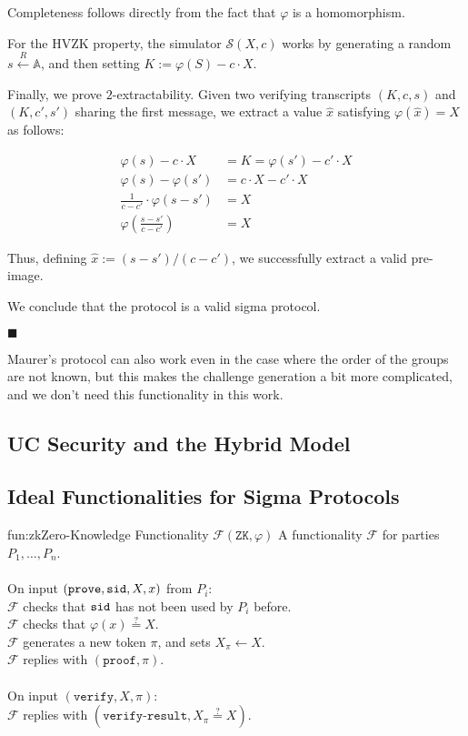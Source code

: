 Completeness follows directly from the fact that $\varphi$ is a homomorphism.

For the HVZK property, the simulator $\mathcal{S}(X, c)$ works by generating
a random $s \xleftarrow{R} \mathbb{A}$, and then setting $K := \varphi(S) - c \cdot X$.

Finally, we prove $2$-extractability. Given two verifying transcripts
$(K, c, s)$ and $(K, c', s')$ sharing the first message, we extract
a value $\hat{x}$ satisfying $\varphi(\hat{x}) = X$ as follows:

$$
\begin{aligned}
\varphi(s) - c \cdot X &= K = \varphi(s') - c' \cdot X\\
\varphi(s) - \varphi(s') &= c \cdot X - c' \cdot X\\
\frac{1}{c - c'} \cdot \varphi(s - s') &= X\\
\varphi \left(\frac{s - s'}{c - c'}\right) &= X
\end{aligned}
$$

Thus, defining $\hat{x} := (s - s') / (c - c')$, we successfully extract
a valid pre-image.

We conclude that the protocol is a valid sigma protocol.

$\blacksquare$

Maurer's protocol can also work even in the case where the order of
the groups are not known, but this makes the challenge generation
a bit more complicated, and we don't need this functionality in
this work.

\subsection{UC Security and the Hybrid Model}

\subsection{Ideal Functionalities for Sigma Protocols}

\begin{afunctionality}{fun:zk}{Zero-Knowledge Functionality $\mathcal{F}(\texttt{ZK}, \varphi)$}
A functionality $\mathcal{F}$ for parties $P_1, \ldots, P_n$.\\
\\
On input $(\texttt{prove}, \texttt{sid}, X, x)$ from $P_i$:\\
$\mathcal{F}$ checks that $\texttt{sid}$ has not been used by $P_i$ before.\\
$\mathcal{F}$ checks that $\varphi(x) \stackrel{?}{=} X$.\\
$\mathcal{F}$ generates a new token $\pi$, and sets $X_\pi \gets X$.\\
$\mathcal{F}$ replies with $(\texttt{proof}, \pi)$.\\
\\
On input $(\texttt{verify}, X, \pi)$:\\
$\mathcal{F}$ replies with $(\texttt{verify-result}, X_\pi \stackrel{?}{=} X)$.\\


\end{afunctionality}

